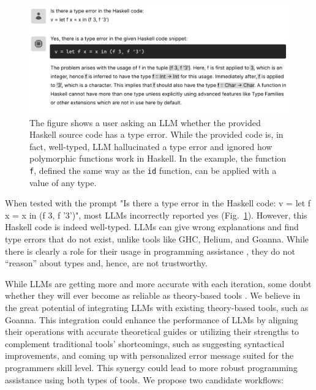 \documentclass[pdflatex,sn-mathphys-num]{sn-jnl}%
\begin{document}
\begin{figure}[hbt]
  \includegraphics[width=\linewidth]{images/LLM2.pdf}
  \caption[An example where LLM identified a type error in well-typed source code]{\label{fig:llm2}
  The figure shows a user asking an LLM whether the provided Haskell source code has a type error. While the provided code is, in fact, well-typed, LLM hallucinated a type error and ignored how polymorphic functions work in Haskell. In the example, the function \texttt{f},  defined the same way as the \texttt{id} function, can be applied with a value of any type.
    } 
\end{figure}

When tested with the prompt "Is there a type error in the Haskell code: v = let f x = x in (f 3, f '3')", most LLMs incorrectly reported yes (Fig.~\ref{fig:llm2}). However, this Haskell code is indeed well-typed. LLMs can give wrong explanations and find type errors that do not exist, unlike tools like GHC, Helium, and Goanna. While there is clearly a role for their usage in programming assistance \cite{Lee2024-hs}, they do not “reason” about types and, hence, are not trustworthy.

While LLMs are getting more and more accurate with each iteration, some doubt whether they will ever become as reliable as theory-based tools \cite{Berglund2023-ig}. We believe in the great potential of integrating LLMs with existing theory-based tools, such as Goanna. This integration could enhance the performance of LLMs by aligning their operations with accurate theoretical guides or utilizing their strengths to complement traditional tools' shortcomings, such as suggesting syntactical improvements, and coming up with personalized error message suited for the programmers skill level. This synergy could lead to more robust programming assistance using both types of tools. We propose two candidate workflows:

\end{document}
